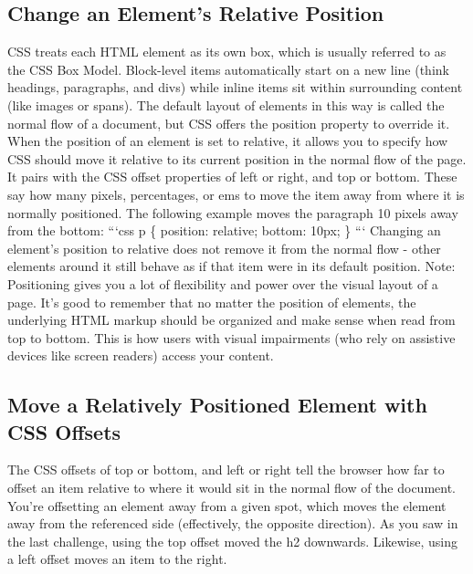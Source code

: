 \documentclass{article}%
\begin{document}
\subsection{Change an Element's Relative Position}%
\label{subsec:ChangeanElementsRelativePosition}%
CSS treats each HTML element as its own box, which is usually referred to as the CSS Box Model. Block{-}level items automatically start on a new line (think headings, paragraphs, and divs) while inline items sit within surrounding content (like images or spans). The default layout of elements in this way is called the normal flow of a document, but CSS offers the position property to override it.\newline%
When the position of an element is set to relative, it allows you to specify how CSS should move it relative to its current position in the normal flow of the page. It pairs with the CSS offset properties of left or right, and top or bottom. These say how many pixels, percentages, or ems to move the item away from where it is normally positioned. The following example moves the paragraph 10 pixels away from the bottom:\newline%
```css\newline%
p \{\newline%
  position: relative;\newline%
  bottom: 10px;\newline%
\}\newline%
```\newline%
Changing an element's position to relative does not remove it from the normal flow {-} other elements around it still behave as if that item were in its default position.\newline%
Note: Positioning gives you a lot of flexibility and power over the visual layout of a page. It's good to remember that no matter the position of elements, the underlying HTML markup should be organized and make sense when read from top to bottom. This is how users with visual impairments (who rely on assistive devices like screen readers) access your content.\newline%

%
\subsection{Move a Relatively Positioned Element with CSS Offsets}%
\label{subsec:MoveaRelativelyPositionedElementwithCSSOffsets}%
The CSS offsets of top or bottom, and left or right tell the browser how far to offset an item relative to where it would sit in the normal flow of the document. You're offsetting an element away from a given spot, which moves the element away from the referenced side (effectively, the opposite direction). As you saw in the last challenge, using the top offset moved the h2 downwards. Likewise, using a left offset moves an item to the right.\newline%
\end{document}

